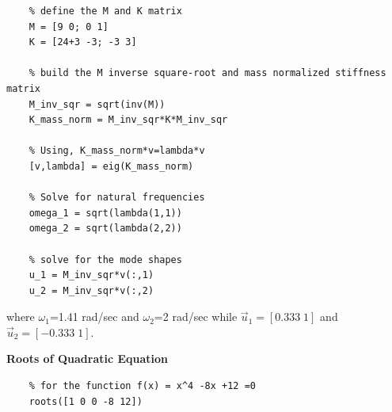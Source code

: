 \documentclass[12pt,letter]{article}
\begin{document}
\begin{example}
	\lstset{linewidth=5.8in}
	\begin{minipage}{1\textwidth}
		\begin{center}
			\begin{lstlisting}
	% define the M and K matrix
	M = [9 0; 0 1]
	K = [24+3 -3; -3 3]
	
	% build the M inverse square-root and mass normalized stiffness matrix 
	M_inv_sqr = sqrt(inv(M))
	K_mass_norm = M_inv_sqr*K*M_inv_sqr
	
	% Using, K_mass_norm*v=lambda*v
	[v,lambda] = eig(K_mass_norm)
	
	% Solve for natural frequencies
	omega_1 = sqrt(lambda(1,1))
	omega_2 = sqrt(lambda(2,2))
	
	% solve for the mode shapes
	u_1 = M_inv_sqr*v(:,1)
	u_2 = M_inv_sqr*v(:,2)
			\end{lstlisting}
		\end{center}
	\end{minipage}
	\noindent where $\omega_1$=1.41 rad/sec and  $\omega_2$=2 rad/sec while $\vec{u}_1 = [0.333 \; 1]$ and $\vec{u}_2 = [-0.333 \; 1]$.
	
	\end{example}
	
	
	\begin{example}
	\textbf{Roots of Quadratic Equation} \\
	\lstset{linewidth=5.8in}
	\begin{minipage}{1\textwidth}
		\begin{center}
			\begin{lstlisting}
	% for the function f(x) = x^4 -8x +12 =0
	roots([1 0 0 -8 12]) 
			\end{lstlisting}
		\end{center}
	\end{minipage}
	\end{example}
	
\end{document}
